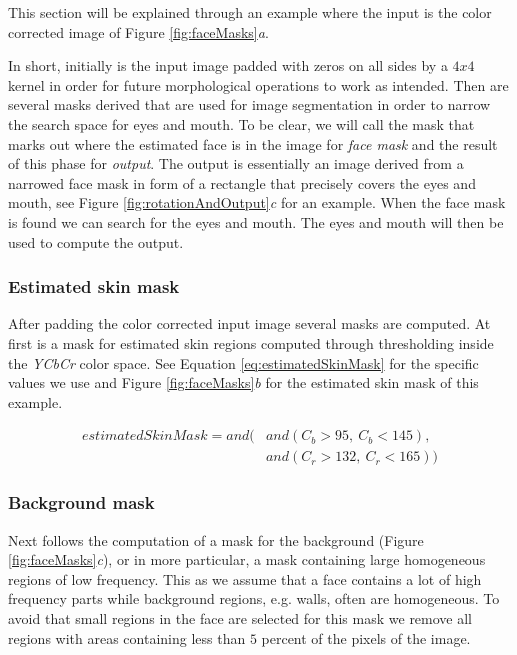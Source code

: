 This section will be explained through an example where the input is the color corrected image of Figure \ref{fig:faceMasks}\textit{a}.



In short, initially is the input image padded with zeros on all sides by a $4x4$ kernel in order for future morphological operations to work as intended. Then are several masks derived that are used for image segmentation in order to narrow the search space for eyes and mouth. To be clear, we will call the mask that marks out where the estimated face is in the image for \textit{face mask} and the result of this phase for \textit{output}. The output is essentially an image derived from a narrowed face mask in form of a rectangle that precisely covers the eyes and mouth, see Figure \ref{fig:rotationAndOutput}\textit{c} for an example. When the face mask is found we can search for the eyes and mouth. The eyes and mouth will then be used to compute the output. 




\subsubsection{Estimated skin mask}
After padding the color corrected input image several masks are computed. At first is a mask for estimated skin regions computed through thresholding inside the \textit{YCbCr} color space. See Equation \ref{eq:estimatedSkinMask} for the specific values we use and Figure \ref{fig:faceMasks}\textit{b} for the estimated skin mask of this example.

\begin{equation} \label{eq:estimatedSkinMask}
\begin{split}
estimatedSkinMask = and( & and(C_{b}> 95, \ C_{b} < 145), \\
 & and(C_{r} > 132, \ C_{r} < 165))
\end{split}
\end{equation}

\subsubsection{Background mask}
Next follows the computation of a mask for the background (Figure \ref{fig:faceMasks}\textit{c}), or in more particular, a mask containing large homogeneous regions of low frequency. This as we assume that a face contains a lot of high frequency parts while background regions, e.g. walls, often are homogeneous. To avoid that small regions in the face are selected for this mask we remove all regions with areas containing less than $5$ percent of the pixels of the image.

